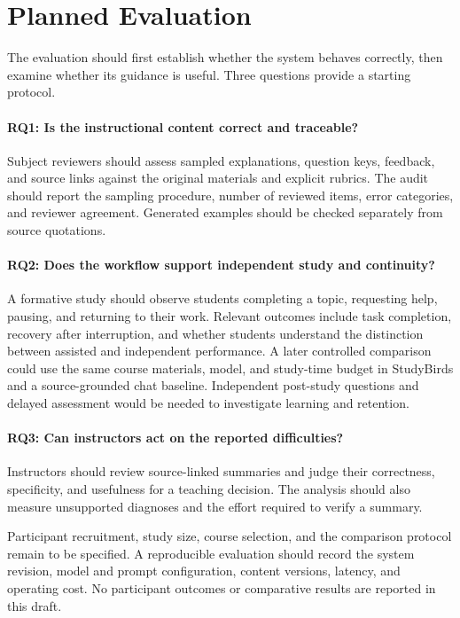 \section{Planned Evaluation}
\label{sec:evaluation}

The evaluation should first establish whether the system behaves
correctly, then examine whether its guidance is useful. Three questions
provide a starting protocol.

\paragraph{RQ1: Is the instructional content correct and traceable?}
Subject reviewers should assess sampled explanations, question keys,
feedback, and source links against the original materials and explicit
rubrics. The audit should report the sampling procedure, number of
reviewed items, error categories, and reviewer agreement. Generated
examples should be checked separately from source quotations.

\paragraph{RQ2: Does the workflow support independent study and continuity?}
A formative study should observe students completing a topic, requesting
help, pausing, and returning to their work. Relevant outcomes include
task completion, recovery after interruption, and whether students
understand the distinction between assisted and independent performance.
A later controlled comparison could use the same course materials,
model, and study-time budget in StudyBirds and a source-grounded chat
baseline. Independent post-study questions and delayed assessment would
be needed to investigate learning and retention.

\paragraph{RQ3: Can instructors act on the reported difficulties?}
Instructors should review source-linked summaries and judge their
correctness, specificity, and usefulness for a teaching decision.
The analysis should also measure unsupported diagnoses and the effort
required to verify a summary.

Participant recruitment, study size, course selection, and the comparison
protocol remain to be specified. A reproducible evaluation should record
the system revision, model and prompt configuration, content versions,
latency, and operating cost. No participant outcomes or comparative
results are reported in this draft.
